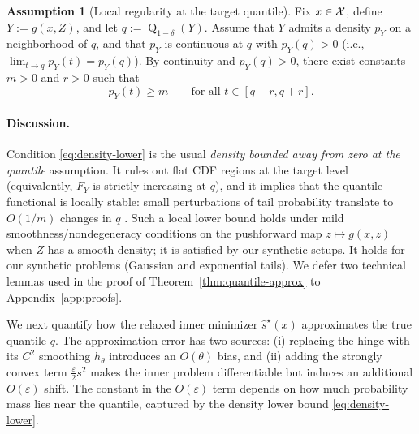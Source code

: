 \documentclass{uai2026} %
\theoremstyle{plain}
\theoremstyle{definition}
\newtheorem{assumption}{Assumption}
\newcommand{\Q}{\operatorname{Q}}
\begin{document}
\begin{assumption}[Local regularity at the target quantile]\label{ass:quantile-regularity}
Fix $x\in\mathcal{X}$, define $Y:=g(x,Z)$, and let $q:=\Q_{1-\delta}(Y)$.
Assume that $Y$ admits a density $p_Y$ on a neighborhood of $q$, and that $p_Y$ is continuous at $q$ with $p_Y(q)>0$ (i.e., $\lim_{t\to q}p_Y(t)=p_Y(q)$).
By continuity and $p_Y(q)>0$, there exist constants $m>0$ and $r>0$ such that
\begin{equation}
  p_Y(t)\ge m\qquad\text{for all }t\in[q-r,q+r].\label{eq:density-lower}
\end{equation}
\end{assumption}

\paragraph{Discussion.}
Condition \eqref{eq:density-lower} is the usual \emph{density bounded away from zero at the quantile} assumption.
It rules out flat CDF regions at the target level (equivalently, $F_Y$ is strictly increasing at $q$), and it implies that the quantile functional is locally stable: small perturbations of tail probability translate to $O(1/m)$ changes in $q$ \citep{vandervaart1998asymptotic,koenker2005quantile}.
Such a local lower bound holds under mild smoothness/nondegeneracy conditions on the pushforward map $z\mapsto g(x,z)$ when $Z$ has a smooth density; it is satisfied by our synthetic setups.
It holds for our synthetic problems (Gaussian and exponential tails).
We defer two technical lemmas used in the proof of Theorem~\ref{thm:quantile-approx} to Appendix~\ref{app:proofs}.


We next quantify how the relaxed inner minimizer $\widehat s^\star(x)$ approximates the true quantile $q$.
The approximation error has two sources: (i) replacing the hinge with its $C^2$ smoothing $h_\theta$ introduces an $O(\theta)$ bias, and (ii) adding the strongly convex term $\tfrac{\varepsilon}{2}s^2$ makes the inner problem differentiable but induces an additional $O(\varepsilon)$ shift.
The constant in the $O(\varepsilon)$ term depends on how much probability mass lies near the quantile, captured by the density lower bound \eqref{eq:density-lower}.
\end{document}

